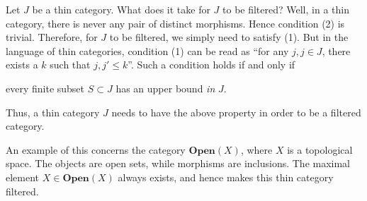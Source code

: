 \begin{example}
    Let $J$ be a thin category. What does it take for $J$ to be filtered? 
    Well, in a thin category, there is never 
    any pair of distinct morphisms. Hence condition (2) is trivial. Therefore, 
    for $J$ to be filtered, we simply need to satisfy (1). But in the language 
    of thin categories, condition (1) can be read as ``for any $j, j \in J$, 
    there exists a $k$ such that $j, j' \le k$''. Such a condition holds 
    if and only if
    \begin{center}
        every finite subset $S \subset J$ has an upper bound \emph{in} $J$.
    \end{center}
    Thus, a thin category $J$ needs to have the above property in order to 
    be a filtered category.

    An example of this concerns the category $\textbf{Open}(X)$, where 
    $X$ is a topological space. The objects are open sets, while morphisms are 
    inclusions. The maximal element $X \in \textbf{Open}(X)$
    always exists, and hence makes this thin category filtered.
\end{example}